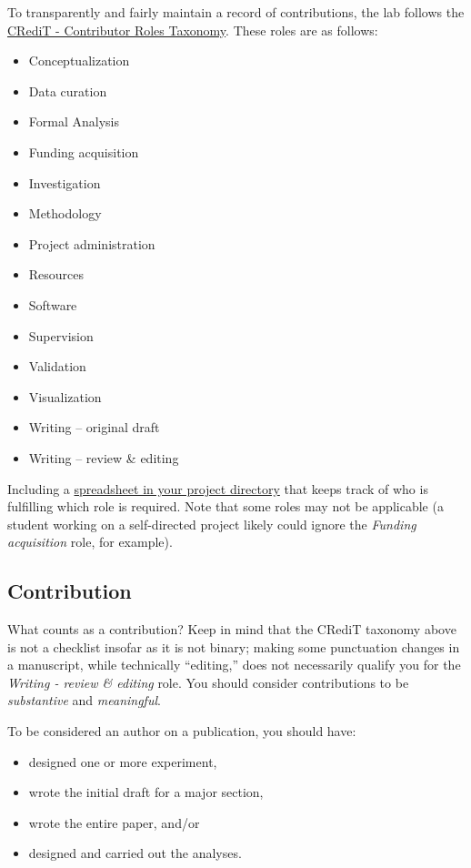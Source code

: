 \documentclass[
]{book}
\providecommand{\tightlist}{%
  \setlength{\itemsep}{0pt}\setlength{\parskip}{0pt}}
\begin{document}
To transparently and fairly maintain a record of contributions, the lab follows the \href{https://casrai.org/credit/}{CRediT - Contributor Roles Taxonomy}. These roles are as follows:

\begin{itemize}
\tightlist
\item
  Conceptualization
\item
  Data curation
\item
  Formal Analysis
\item
  Funding acquisition
\item
  Investigation
\item
  Methodology
\item
  Project administration
\item
  Resources
\item
  Software
\item
  Supervision
\item
  Validation
\item
  Visualization
\item
  Writing -- original draft
\item
  Writing -- review \& editing
\end{itemize}

Including a \href{https://osf.io/wj3hb/}{spreadsheet in your project directory} that keeps track of who is fulfilling which role is required. Note that some roles may not be applicable (a student working on a self-directed project likely could ignore the \emph{Funding acquisition} role, for example).

\hypertarget{contribution}{%
\subsection{Contribution}\label{contribution}}

What counts as a contribution? Keep in mind that the CRediT taxonomy above is not a checklist insofar as it is not binary; making some punctuation changes in a manuscript, while technically ``editing,'' does not necessarily qualify you for the \emph{Writing - review \& editing} role. You should consider contributions to be \emph{substantive} and \emph{meaningful}.

To be considered an author on a publication, you should have:

\begin{itemize}
\tightlist
\item
  designed one or more experiment,
\item
  wrote the initial draft for a major section,
\item
  wrote the entire paper, and/or
\item
  designed and carried out the analyses.
\end{itemize}
\end{document}
